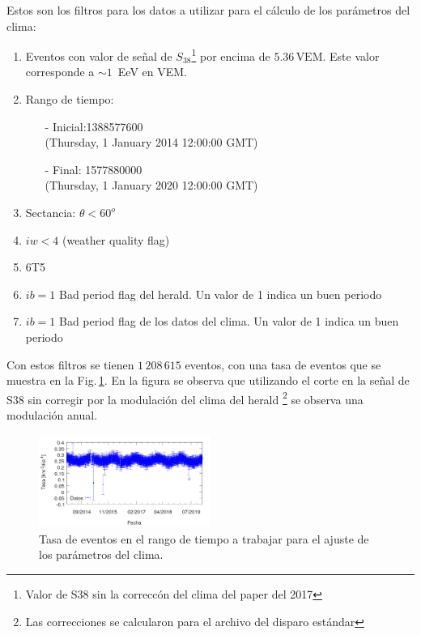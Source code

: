 Estos son los filtros para los datos a utilizar para el cálculo de los parámetros del clima:

\begin{enumerate}
	\item Eventos con valor de señal de $S_{38}$\footnote{Valor de S38 sin la correccón del clima del paper del 2017} por encima de  $5.36\,\text{VEM}$. Este valor corresponde a $\sim 1\,$ EeV  en VEM.
	\item Rango de tiempo:
	\begin{itemize}
		\item[-] Inicial:1388577600 \\ (Thursday, 1 January 2014 12:00:00 GMT)
		\item[-] Final: 1577880000  \\ (Thursday, 1 January 2020 12:00:00 GMT)
	\end{itemize}
	\item Sectancia:  $\theta < 60^o$
	\item $iw<4$ (weather quality flag)
	\item 6T5
	\item $ib=1$ Bad period flag del herald.  Un valor de 1 indica un buen periodo
	\item $ib=1$ Bad period flag de los datos del clima. Un valor de 1 indica un buen periodo
\end{enumerate}


Con estos filtros se tienen $1\,208\,615$ eventos, con una tasa de eventos que se muestra en la Fig.\,\ref{tasa_total_diaria_ajuste_weather}. En la figura se observa que utilizando el corte en la señal de S38 sin corregir por la modulación del clima del herald \footnote{Las correcciones se calcularon para el archivo del disparo estándar} se observa una modulación anual.

\begin{figure}[H]
	\centering
	\includegraphics[width=0.5\textwidth]{rate_total_ajuste_weather.png}
	\caption{Tasa  de eventos en el rango de tiempo a trabajar para el ajuste de los parámetros del clima.}
	\label{tasa_total_diaria_ajuste_weather}
\end{figure}


